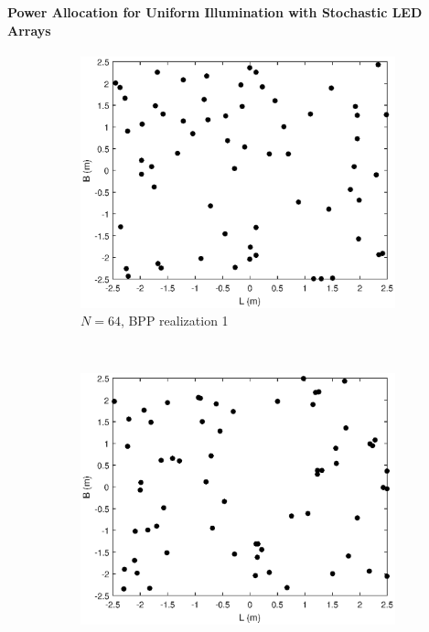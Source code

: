 \documentclass{beamer}
\theoremstyle{remark}
\begin{document}
\begin{frame}
\frametitle{\,}
\framesubtitle{Power Allocation for Uniform Illumination with
Stochastic LED Arrays}
\begin{figure}[h!]
    \centering
    \begin{subfigure}[t]{0.5\columnwidth}
        \centering
        \includegraphics[scale=.2]{LEDRealization1}
        \caption{$N=64$, BPP realization 1}
\label{fig:two_realize:led1}        
    \end{subfigure}%
    ~ 
    \begin{subfigure}[t]{0.5\columnwidth}
        \centering
        \includegraphics[scale=.2]{LEDRealization2}

\end{subfigure}
\end{figure}
\end{frame}
\end{document}
